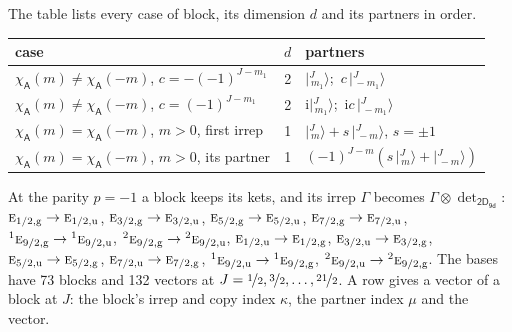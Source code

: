 \documentclass[10pt,a4paper]{article}
\numberwithin{equation}{section}
\newcommand{\grp}[1]{\mathsf{#1}}
\newcommand{\irr}[1]{\text{\normalfont\scshape #1}}
\newcommand{\conjpair}[1]{{}^{#1}}
\newcommand{\ptag}[1]{\mathrm{#1}}
\newcommand{\iunit}{\mathrm{i}}
\newcommand{\chiA}{\chi_{\grp{A}}}
\newcommand{\irrprod}{\otimes}
\newcommand{\mult}{\kappa}
\newcommand{\intx}{\mu}
\newcommand{\jm}[2]{\bigl\lvert{}^{#1}_{\,#2}\bigr\rangle}
\begin{document}
\leavevmode\label{n:head.case}\label{n:head.partners}The table lists every case of block, its dimension $d$ and its partners in order.
\begin{center}\begin{tabular}{@{}lrl@{}}\toprule
case & $d$ & partners\\\midrule
$\chiA(m) \ne \chiA(-m)$, $c = -(-1)^{J-m_1}$ & 2 & $\jm{J}{m_1}$;\ $c\,\jm{J}{-m_1}$\\
$\chiA(m) \ne \chiA(-m)$, $c = (-1)^{J-m_1}$ & 2 & $\iunit\jm{J}{m_1}$;\ $\iunit c\,\jm{J}{-m_1}$\\
$\chiA(m) = \chiA(-m)$, $m > 0$, first irrep & 1 & $\jm{J}{m} + s\,\jm{J}{-m}$, $s = \pm1$\\
$\chiA(m) = \chiA(-m)$, $m > 0$, its partner & 1 & $(-1)^{J-m}(s\,\jm{J}{m} + \jm{J}{-m})$\\
\bottomrule\end{tabular}\end{center}
At the parity $p = -1$ a block keeps its kets, and its irrep $\Gamma$ becomes $\Gamma \irrprod \det_{\grp{2D_{9d}}}$: $\irr{e}_{1/2,\ptag{g}} \to \irr{e}_{1/2,\ptag{u}}$, $\irr{e}_{3/2,\ptag{g}} \to \irr{e}_{3/2,\ptag{u}}$, $\irr{e}_{5/2,\ptag{g}} \to \irr{e}_{5/2,\ptag{u}}$, $\irr{e}_{7/2,\ptag{g}} \to \irr{e}_{7/2,\ptag{u}}$, $\conjpair{1}\irr{e}_{9/2,\ptag{g}} \to \conjpair{1}\irr{e}_{9/2,\ptag{u}}$, $\conjpair{2}\irr{e}_{9/2,\ptag{g}} \to \conjpair{2}\irr{e}_{9/2,\ptag{u}}$, $\irr{e}_{1/2,\ptag{u}} \to \irr{e}_{1/2,\ptag{g}}$, $\irr{e}_{3/2,\ptag{u}} \to \irr{e}_{3/2,\ptag{g}}$, $\irr{e}_{5/2,\ptag{u}} \to \irr{e}_{5/2,\ptag{g}}$, $\irr{e}_{7/2,\ptag{u}} \to \irr{e}_{7/2,\ptag{g}}$, $\conjpair{1}\irr{e}_{9/2,\ptag{u}} \to \conjpair{1}\irr{e}_{9/2,\ptag{g}}$, $\conjpair{2}\irr{e}_{9/2,\ptag{u}} \to \conjpair{2}\irr{e}_{9/2,\ptag{g}}$.
The bases have 73 blocks and 132 vectors at $J = \nicefrac{1}{2}, \nicefrac{3}{2}, \dots, \nicefrac{21}{2}$. \label{n:head.vector}A row gives a vector of a block at $J$: the block's irrep and copy index $\mult$, the partner index $\intx$ and the vector.
\end{document}

